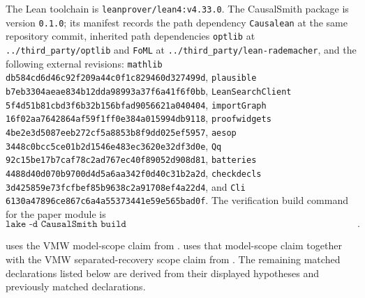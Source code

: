 The Lean toolchain is \texttt{leanprover/lean4:v4.33.0}. The CausalSmith package is version \texttt{0.1.0}; its manifest records the path dependency \texttt{Causalean} at the same repository commit, inherited path dependencies \texttt{optlib} at \texttt{../third\_party/optlib} and \texttt{FoML} at \texttt{../third\_party/lean-rademacher}, and the following external revisions: \texttt{mathlib} \texttt{db584cd6d46c92f209a44c0f1c829460d327499d}, \texttt{plausible} \texttt{b7eb3304aeae834b12dda98993a37f6a41f6f0bb}, \texttt{LeanSearchClient} \texttt{5f4d51b81cbd3f6b32b156bfad9056621a040404}, \texttt{importGraph} \texttt{16f02aa7642864af59f1ff0e384a015994db9118}, \texttt{proofwidgets} \texttt{4be2e3d5087eeb272cf5a8853b8f9dd025ef5957}, \texttt{aesop} \texttt{3448c0bcc5ce01b2d1546e483ec3620e32df3d0e}, \texttt{Qq} \texttt{92c15be17b7caf78c2ad767ec40f89052d908d81}, \texttt{batteries} \texttt{4488d40d070b9700d4d5a6aa342f0d40c31b2a2d}, \texttt{checkdecls} \texttt{3d425859e73fcfbef85b9638c2a91708ef4a22d4}, and \texttt{Cli} \texttt{6130a47896ce867c6a4a55373441e59e565bad0f}. The verification build command for the paper module is
\[
\texttt{lake -d CausalSmith build CausalSmith.Stat.STAT\_ProxyEffectlawEigencollisionFrontier\_Research}.
\]

 uses the VMW model-scope claim from \citep[Assumptions 1--2 and Section 4.2]{VirkMazaheriWu2026}.  uses that model-scope claim together with the VMW separated-recovery scope claim from \citep[Assumption 3, Assumption 4, and Theorem 7.2]{VirkMazaheriWu2026}. The remaining matched declarations listed below are derived from their displayed hypotheses and previously matched declarations.

